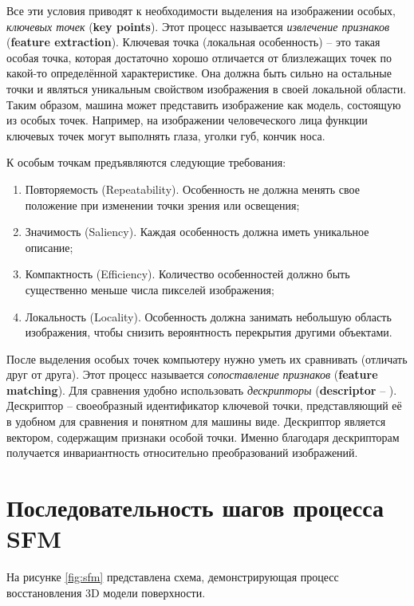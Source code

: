Все эти условия приводят к необходимости выделения на изображении особых, \textit{ключевых точек} (\textbf{key points}). Этот процесс называется \textit{извлечение признаков} (\textbf{feature extraction}). Ключевая точка (локальная особенность) -- это такая особая точка, которая достаточно хорошо отличается от близлежащих точек по какой-то определённой характеристике. Она должна быть сильно  на остальные точки и являться уникальным свойством изображения в своей локальной области. Таким образом, машина может представить изображение как модель, состоящую из особых точек. Например, на изображении человеческого лица функции ключевых точек могут выполнять глаза, уголки губ, кончик носа.

К особым точкам предъявляются следующие требования:
\begin{enumerate}
    \item Повторяемость (Repeatability). Особенность не должна менять свое положение при изменении точки зрения или освещения;
    \item Значимость (Saliency). Каждая особенность должна иметь уникальное описание;
    \item Компактность (Efficiency). Количество особенностей должно быть существенно меньше числа пикселей изображения;
    \item Локальность (Locality). Особенность должна занимать небольшую область изображения, чтобы снизить вероянтность перекрытия другими объектами.
\end{enumerate}

После выделения особых точек компьютеру нужно уметь их сравнивать (отличать друг от друга). Этот процесс называется \textit{сопоставление признаков} (\textbf{feature matching}). Для сравнения удобно использовать \textit{дескрипторы} (\textbf{descriptor} -- ). Дескриптор -- своеобразный идентификатор ключевой точки, представляющий её в удобном для сравнения и понятном для машины виде. Дескриптор является вектором, содержащим признаки особой точки. Именно благодаря дескрипторам получается инвариантность относительно преобразований изображений.


\section{Последовательность шагов процесса SFM}

На рисунке \ref{fig:sfm} представлена схема, демонстрирующая процесс восстановления 3D модели поверхности. 

